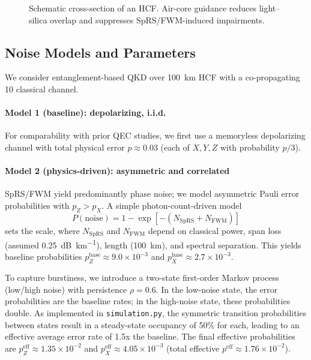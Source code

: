 \documentclass[conference]{IEEEtran}
\begin{document}
\begin{figure}[t]
\centering
{}
\caption{Schematic cross-section of an HCF. Air-core guidance reduces light--silica overlap and suppresses SpRS/FWM-induced impairments.}
\label{fig:hcf}
\end{figure}

\subsection{Noise Models and Parameters}\label{sec:noise_models}
We consider entanglement-based QKD over \SI{100}{\kilo\meter} HCF with a co-propagating \SI{10}{\dBm} classical channel.

\paragraph*{Model 1 (baseline): depolarizing, i.i.d.}
For comparability with prior QEC studies, we first use a memoryless depolarizing channel with total physical error \(p\approx0.03\) (each of \(X,Y,Z\) with probability \(p/3\)).

\paragraph*{Model 2 (physics-driven): asymmetric and correlated}
SpRS/FWM yield predominantly phase noise; we model asymmetric Pauli error probabilities with \(p_Z\!>\!p_X\). A simple photon-count-driven model
\begin{equation}
P(\mathrm{noise})=1-\exp[-(N_{\mathrm{SpRS}}+N_{\mathrm{FWM}})]
\end{equation}
sets the scale, where \(N_{\mathrm{SpRS}}\) and \(N_{\mathrm{FWM}}\) depend on classical power, span loss (assumed \SI{0.25}{\dB\per\kilo\meter}), length (\SI{100}{\kilo\meter}), and spectral separation. This yields baseline probabilities \(p_Z^{\mathrm{base}}\approx9.0\times10^{-3}\) and \(p_X^{\mathrm{base}}\approx2.7\times10^{-3}\).

To capture burstiness, we introduce a two-state first-order Markov process (low/high noise) with persistence \(\rho=0.6\). In the low-noise state, the error probabilities are the baseline rates; in the high-noise state, these probabilities double. As implemented in \texttt{simulation.py}, the symmetric transition probabilities between states result in a steady-state occupancy of 50\% for each, leading to an effective average error rate of 1.5x the baseline. The final effective probabilities are \(p_Z^{\mathrm{eff}} \approx 1.35\times10^{-2}\) and \(p_X^{\mathrm{eff}} \approx 4.05\times10^{-3}\) (total effective \(p^{\mathrm{eff}}\approx1.76\times10^{-2}\)).
\end{document}
